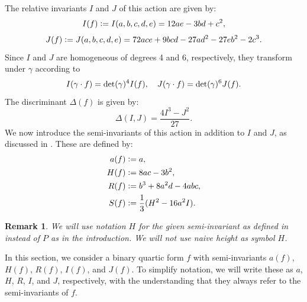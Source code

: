 \documentclass{article}
\newtheorem{remark}[theorem]{Remark}
\def \det{{\rm det}}
\begin{document}
The relative invariants $I$ and $J$ of this action are given by:
\begin{equation}\label{I}
I(f) \vcentcolon= I(a,b,c,d,e) = 12ae - 3bd + c^2,
\end{equation}
\begin{equation}\label{J}
J(f) \vcentcolon= J(a,b,c,d,e) = 72ace + 9bcd - 27ad^2 - 27eb^2 - 2c^3.
\end{equation}
Since $I$ and $J$ are homogeneous of degrees 4 and 6, respectively, they transform under $\gamma$ according to
\begin{equation*}
I(\gamma \cdot f) = \det(\gamma)^4 I(f), \quad J(\gamma \cdot f) = \det(\gamma)^6 J(f).
\end{equation*}
The discriminant $\Delta(f)$ is given by:
\begin{equation*}
\Delta(I,J) = \frac{4I^3 - J^2}{27}.
\end{equation*}
We now introduce the semi-invariants of this action in addition to \( I \) and \( J \), as discussed in \cite{cremona1}. These are defined by:
\begin{align}
    a(f) &\vcentcolon= a, \nonumber \\
    H(f) &\vcentcolon= 8ac - 3b^2,  \label{H} \\
    R(f) &\vcentcolon= b^3 + 8a^2d - 4abc, \label{R} \\
    S(f) &\vcentcolon= \frac{1}{3}(H^2 - 16a^2I). \nonumber
\end{align}

\begin{remark}
    We will use notation $H$ for the given semi-invariant as defined in \cite{cremona1} instead of $P$ as in the introduction. We will not use naive height as symbol $H$. 
\end{remark}
In this section, we consider a binary quartic form $f$ with semi-invariants $a(f)$, $H(f)$, $R(f)$, $I(f)$, and $J(f)$. To simplify notation, we will write these as $a$, $H$, $R$, $I$, and $J$, respectively, with the understanding that they always refer to the semi-invariants of $f$.
\end{document}
